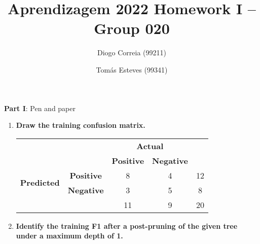 \documentclass[12pt]{article}
\title{\large{Aprendizagem 2022}\vskip 0.2cm Homework I -- Group 020}
\date{}
\author{Diogo Correia (99211) \and Tomás Esteves (99341)}
\begin{document}
\maketitle
\center\large{\vskip -1.0cm\textbf{Part I}: Pen and paper}
\begin{enumerate}[leftmargin=\labelsep]
    Given the following decision tree learnt from 20 observation using Shannon entropy, with leaf annotations (\texttt{\#correct/\#total}).

    \begin{figure}[H]
        \centering
        
        \caption{Decision Tree from Part I}
        \label{fig:decision-tree}
    \end{figure}

    \item \textbf{Draw the training confusion matrix.}\\
          \vspace{0.5em}
          \begin{center}

              \begin{tabular}{|c|c|c|c|c|}
                  \cline{3-4}
                  \multicolumn{2}{c}{}                & \multicolumn{2}{|c|}{\textbf{Actual}} & \multicolumn{1}{c}{}                             \\
                  \cline{3-4}
                  \multicolumn{2}{c|}{}               & \textbf{Positive}                     & \textbf{Negative}    & \multicolumn{1}{c}{}      \\
                  \hline
                  \multirow{2}{*}{\textbf{Predicted}} & \textbf{Positive}                     & 8                    & 4                    & 12 \\
                  \cline{2-5}
                                                      & \textbf{Negative}                     & 3                    & 5                    & 8  \\
                  \hline
                  \multicolumn{2}{c|}{}               & 11                                    & 9                    & 20                        \\
                  \cline{3-5}
              \end{tabular}
          \end{center}

    \item \textbf{Identify the training F1 after a post-pruning of the given tree under a maximum depth of 1.}


\end{enumerate}
\end{document}
